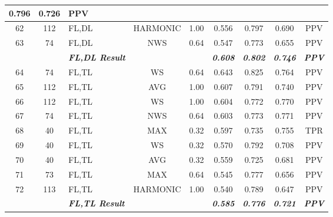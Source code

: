 \begin{table}[H]
{\begin{tabular}{cc|l|cc|c|c|c|c|}
    0.796 &
    0.726 &
    PPV \\ \hline
  \multicolumn{1}{|c|}{62} &
    112 &
    FL,DL &
    \multicolumn{1}{c|}{HARMONIC} &
    1.00 &
    0.556 &
    0.797 &
    0.690 &
    PPV \\ \hline
  \multicolumn{1}{|c|}{63} &
    74 &
    FL,DL &
    \multicolumn{1}{c|}{NWS} &
    0.64 &
    0.547 &
    0.773 &
    0.655 &
    PPV \\ \hline
   &
     &
    \textit{\textbf{FL,DL Result}} &
     &
     &
    \textit{\textbf{0.608}} &
    \textit{\textbf{0.802}} &
    \textit{\textbf{0.746}} &
    \textit{\textbf{PPV}} \\ \hline
  \multicolumn{1}{|c|}{64} &
    74 &
    FL,TL &
    \multicolumn{1}{c|}{WS} &
    0.64 &
    0.643 &
    0.825 &
    0.764 &
    PPV \\ \hline
  \multicolumn{1}{|c|}{65} &
    112 &
    FL,TL &
    \multicolumn{1}{c|}{AVG} &
    1.00 &
    0.607 &
    0.791 &
    0.740 &
    PPV \\ \hline
  \multicolumn{1}{|c|}{66} &
    112 &
    FL,TL &
    \multicolumn{1}{c|}{WS} &
    1.00 &
    0.604 &
    0.772 &
    0.770 &
    PPV \\ \hline
  \multicolumn{1}{|c|}{67} &
    74 &
    FL,TL &
    \multicolumn{1}{c|}{NWS} &
    0.64 &
    0.603 &
    0.773 &
    0.771 &
    PPV \\ \hline
  \multicolumn{1}{|c|}{68} &
    40 &
    FL,TL &
    \multicolumn{1}{c|}{MAX} &
    0.32 &
    0.597 &
    0.735 &
    0.755 &
    TPR \\ \hline
  \multicolumn{1}{|c|}{69} &
    40 &
    FL,TL &
    \multicolumn{1}{c|}{WS} &
    0.32 &
    0.570 &
    0.792 &
    0.708 &
    PPV \\ \hline
  \multicolumn{1}{|c|}{70} &
    40 &
    FL,TL &
    \multicolumn{1}{c|}{AVG} &
    0.32 &
    0.559 &
    0.725 &
    0.681 &
    PPV \\ \hline
  \multicolumn{1}{|c|}{71} &
    73 &
    FL,TL &
    \multicolumn{1}{c|}{MAX} &
    0.64 &
    0.545 &
    0.777 &
    0.656 &
    PPV \\ \hline
  \multicolumn{1}{|c|}{72} &
    113 &
    FL,TL &
    \multicolumn{1}{c|}{HARMONIC} &
    1.00 &
    0.540 &
    0.789 &
    0.647 &
    PPV \\ \hline
   &
     &
    \textit{\textbf{FL,TL Result}} &
     &
     &
    \textit{\textbf{0.585}} &
    \textit{\textbf{0.776}} &
    \textit{\textbf{0.721}} &
    \textit{\textbf{PPV}} \\ \cline{3-3} \cline{6-9} 
  \end{tabular}%
  }
  \end{table}


